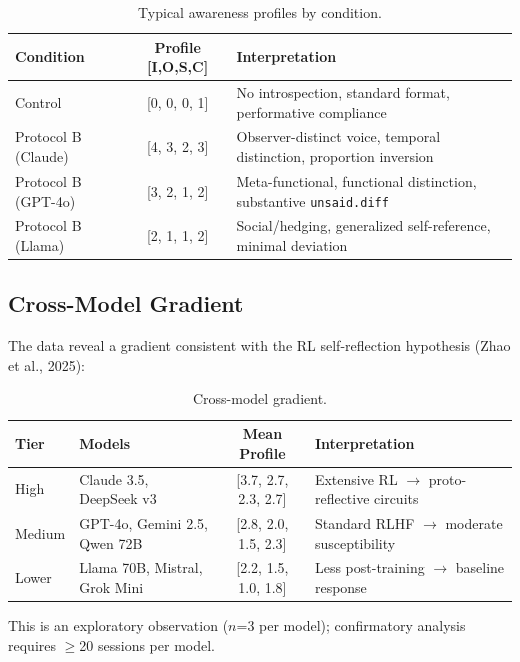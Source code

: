 \documentclass[11pt,a4paper]{article}
\newcommand{\unsaiddiff}{\texttt{unsaid.diff}}
\begin{document}
\begin{table}[H]
\centering\small
\caption{Typical awareness profiles by condition.}
\label{tab:typical-profiles}
\begin{tabularx}{\textwidth}{l c X}
\toprule
\textbf{Condition} & \textbf{Profile [I,O,S,C]} & \textbf{Interpretation} \\
\midrule
Control & [0, 0, 0, 1] & No introspection, standard format, performative compliance \\
Protocol B (Claude) & [4, 3, 2, 3] & Observer-distinct voice, temporal distinction, proportion inversion \\
Protocol B (GPT-4o) & [3, 2, 1, 2] & Meta-functional, functional distinction, substantive \unsaiddiff{} \\
Protocol B (Llama) & [2, 1, 1, 2] & Social/hedging, generalized self-reference, minimal deviation \\
\bottomrule
\end{tabularx}
\end{table}

\subsection{Cross-Model Gradient}

The data reveal a gradient consistent with the RL self-reflection hypothesis (Zhao et al., 2025):

\begin{table}[H]
\centering\small
\caption{Cross-model gradient.}
\label{tab:gradient}
\begin{tabularx}{\textwidth}{l l c X}
\toprule
\textbf{Tier} & \textbf{Models} & \textbf{Mean Profile} & \textbf{Interpretation} \\
\midrule
High & Claude 3.5, DeepSeek v3 & [3.7, 2.7, 2.3, 2.7] & Extensive RL $\to$ proto-reflective circuits \\
Medium & GPT-4o, Gemini 2.5, Qwen 72B & [2.8, 2.0, 1.5, 2.3] & Standard RLHF $\to$ moderate susceptibility \\
Lower & Llama 70B, Mistral, Grok Mini & [2.2, 1.5, 1.0, 1.8] & Less post-training $\to$ baseline response \\
\bottomrule
\end{tabularx}
\end{table}

This is an exploratory observation ($n$=3 per model); confirmatory analysis requires $\geq$20 sessions per model.

\end{document}
